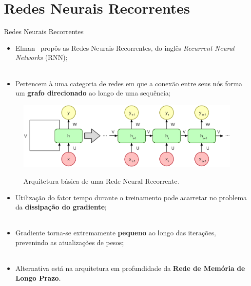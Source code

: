\section{Redes Neurais Recorrentes}
\label{s.rnn}

\begin{frame}{Redes Neurais Recorrentes}
	\begin{itemize}
		\justifying
		\item Elman~\cite{Elman:90} propôs as Redes Neurais Recorrentes, do inglês \emph{Recurrent Neural Networks} (RNN);
		\\~\\
		\item Pertencem à uma categoria de redes em que a conexão entre seus nós forma um \textbf{grafo direcionado} ao longo de uma sequência;
	\end{itemize}
\end{frame}

\begin{frame}
	\begin{figure}[!ht]
		\centering
		\includegraphics[scale=0.4]{figs/rnn.eps}	
		\label{f.rnn}
		\caption{Arquitetura básica de uma Rede Neural Recorrente.}
	\end{figure}
\end{frame}

\begin{frame}
	\begin{itemize}
		\justifying
		\item Utilização do fator tempo durante o treinamento pode acarretar no problema da \textbf{dissipação do gradiente};
		\\~\\
		\item Gradiente torna-se extremamente \textbf{pequeno} ao longo das iterações, prevenindo as atualizações de pesos;
		\\~\\
		\item Alternativa está na arquitetura em profundidade da \textbf{Rede de Memória de Longo Prazo}.
	\end{itemize}
\end{frame}

